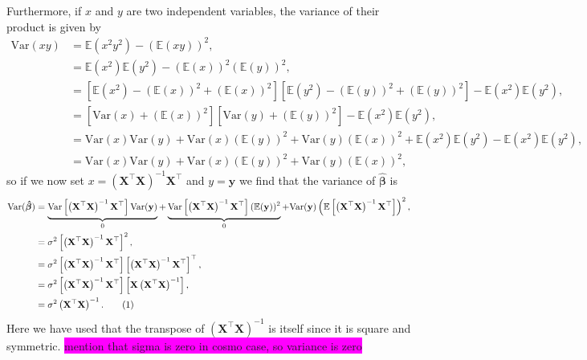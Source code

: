 \documentclass[aps,pra,english,notitlepage,reprint,nofootinbib]{revtex4-1}  %
\newcommand\numberthis{\addtocounter{equation}{1}\tag{\theequation}}
\begin{document}
Furthermore, if $x$ and $y$ are two independent variables, the variance of their product is given by
\begin{align*}
\textrm{Var}(xy) &= \mathbb{E}(x^2y^2)-(\mathbb{E}(xy))^2, \\
&= \mathbb{E}(x^2)\mathbb{E}(y^2) - \left(\mathbb{E}(x)\right)^2\left(\mathbb{E}(y)\right)^2,
\\
&= \left[\mathbb{E}(x^2) - \left(\mathbb{E}(x)\right)^2 + \left(\mathbb{E}(x)\right)^2\right]\left[\mathbb{E}(y^2) - \left(\mathbb{E}(y)\right)^2 + \left(\mathbb{E}(y)\right)^2\right] - \mathbb{E}(x^2)\mathbb{E}(y^2),
\\
&= \left[\textrm{Var}(x) + \left(\mathbb{E}(x)\right)^2\right]\left[\textrm{Var}(y) + \left(\mathbb{E}(y)\right)^2\right] - \mathbb{E}(x^2)\mathbb{E}(y^2), \\
&= \textrm{Var}(x)\textrm{Var}(y) + \textrm{Var}(x)(\mathbb{E}(y))^2 + \textrm{Var}(y)(\mathbb{E}(x))^2 +\mathbb{E}(x^2)\mathbb{E}(y^2)- \mathbb{E}(x^2)\mathbb{E}(y^2),
\\
&= \textrm{Var}(x)\textrm{Var}(y) + \textrm{Var}(x)(\mathbb{E}(y))^2 + \textrm{Var}(y)(\mathbb{E}(x))^2,
\end{align*}
so if we now set $x=\left(\mathbf{X}^\top\mathbf{X}\right)^{-1}\mathbf{X}^\top$ and $y=\mathbf{y}$ we find that the variance of $\boldsymbol{\hat{\beta}}$ is
\begin{align*}
\textrm{Var}(\boldsymbol{\hat{\beta}}) 
&= \underbrace{\textrm{Var}\left[\left(\mathbf{X}^\top\mathbf{X}\right)^{-1}\mathbf{X}^\top\right]\textrm{Var}(\mathbf{y})}_0 
+ \underbrace{\textrm{Var}\left[\left(\mathbf{X}^\top\mathbf{X}\right)^{-1}\mathbf{X}^\top\right](\mathbb{E}(\mathbf{y}))^2}_{0} 
+ \textrm{Var}(\mathbf{y})\left(\mathbb{E}\left[\left(\mathbf{X}^\top\mathbf{X}\right)^{-1}\mathbf{X}^\top\right]\right)^2,
\\
&= \sigma^2\left[\left(\mathbf{X}^\top\mathbf{X}\right)^{-1}\mathbf{X}^\top\right]^2,
\\
&= \sigma^2\left[\left(\mathbf{X}^\top\mathbf{X}\right)^{-1}\mathbf{X}^\top\right]\left[\left(\mathbf{X}^\top\mathbf{X}\right)^{-1}\mathbf{X}^\top\right]^\top,
\\
&= \sigma^2\left[\left(\mathbf{X}^\top\mathbf{X}\right)^{-1}\mathbf{X}^\top\right]\left[\mathbf{X}\left(\mathbf{X}^\top\mathbf{X}\right)^{-1}\right],
\\
&= \sigma^2\left(\mathbf{X}^\top\mathbf{X}\right)^{-1}. \numberthis \label{appeq:var beta OLS}
\end{align*}
Here we have used that the transpose of $\left(\mathbf{X}^\top\mathbf{X}\right)^{-1}$ is itself since it is square and symmetric.
\colorbox{magenta}{mention that sigma is zero in cosmo case, so variance is zero}
\end{document}

